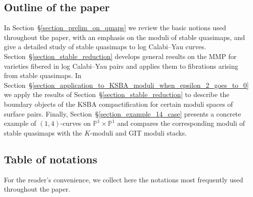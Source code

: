 \documentclass[a4paper,12pt]{amsart}
\theoremstyle{definition}
\theoremstyle{remark}
\begin{document}
\subsection*{Outline of the paper}

In Section~\S\ref{section_prelim_on_qmaps} we review the basic notions used throughout the paper, with an emphasis on the moduli of stable quasimaps, and give a detailed study of stable quasimaps to log Calabi--Yau curves.  
Section~\S\ref{section_stable_reduction} develops general results on the MMP for varieties fibered in log Calabi--Yau pairs and applies them to fibrations arising from stable quasimaps.  
In Section~\S\ref{section_application_to_KSBA_moduli_when_epsilon_2_goes_to_0} we apply the results of Section~\S\ref{section_stable_reduction} to describe the boundary objects of the KSBA compactification for certain moduli spaces of surface pairs.  
Finally, Section~\S\ref{section_example_14_case} presents a concrete example of \((1,4)\)-curves on \(\mathbb{P}^1\times\mathbb{P}^1\) and compares the corresponding moduli of stable quasimaps with the \(K\)-moduli and GIT moduli stacks.


\subsection*{Table of notations}

For the reader’s convenience, we collect here the notations most frequently used throughout the paper.

\renewcommand{\arraystretch}{1.5}
\end{document}
